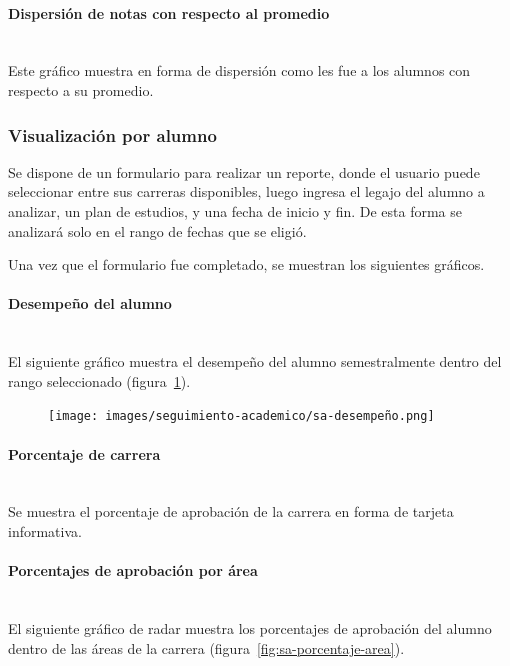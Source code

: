 \paragraph{Dispersión de notas con respecto al promedio} \mbox{}\\
Este gráfico muestra en forma de dispersión como les fue a los alumnos con respecto a su promedio.

\subsubsection{Visualización por alumno}
Se dispone de un formulario para realizar un reporte, donde el usuario puede seleccionar entre sus carreras disponibles, luego ingresa el legajo del alumno a analizar, un plan de estudios, y una fecha de inicio y fin. De esta forma se analizará solo en el rango de fechas que se eligió.

Una vez que el formulario fue completado, se muestran los siguientes gráficos.

\paragraph{Desempeño del alumno} \mbox{}\\
El siguiente gráfico muestra el desempeño del alumno semestralmente dentro del rango seleccionado  (figura~\ref{fig:sa-detalle-aprobacion}).
\begin{figure}[H]
  \centering
    \texttt{[image: images/seguimiento-academico/sa-desempeño.png]}
  \label{fig:sa-detalle-aprobacion}
\end{figure}

\paragraph{Porcentaje de carrera} \mbox{}\\
Se muestra el porcentaje de aprobación de la carrera en forma de tarjeta informativa.

\paragraph{Porcentajes de aprobación por área} \mbox{}\\
El siguiente gráfico de radar muestra los porcentajes de aprobación del alumno dentro de las áreas de la carrera (figura~\ref{fig:sa-porcentaje-area}).


